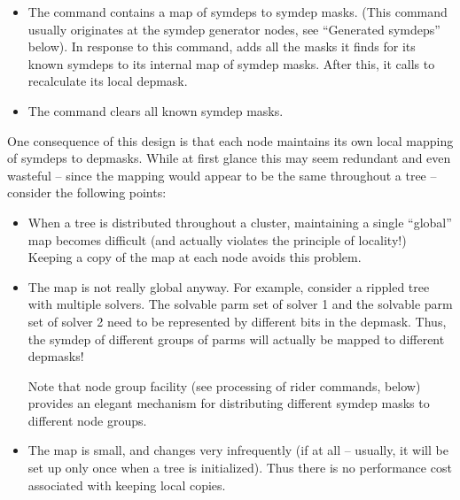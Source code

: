 \documentclass[10pt,twoside]{book}
\begin{document}
  \begin{itemize}
  
  \item The  command contains a map of symdeps to symdep
    masks. (This command usually originates at the symdep generator nodes, see
    ``Generated symdeps'' below). In response to this command,  adds
    all the masks it finds for its known symdeps to its internal map of symdep
    masks. After this, it calls  to recalculate its
    local depmask. 

  \item The  command clears all known symdep masks.
  
  \end{itemize}
  
  One consequence of this design is that each node maintains its own local
  mapping of symdeps to depmasks. While at first glance this may seem redundant
  and even wasteful -- since the mapping would appear to be the same throughout
  a tree -- consider the following points:

  \begin{itemize}
  
  \item When a tree is distributed throughout a cluster, maintaining a single
    ``global'' map becomes difficult (and actually violates the principle of
    locality!) Keeping a copy of the map at each node avoids this problem.

  \item The map is not really global anyway. For example, consider a rippled
    tree with multiple solvers. The solvable parm set of solver 1 and the
    solvable parm set of solver 2 need to be represented by different bits in
    the depmask. Thus, the  symdep of different groups of
    parms will actually be mapped to different depmasks!
    
    Note that node group facility (see processing of rider commands, below)
    provides an elegant mechanism for distributing different symdep masks to
    different node groups.
    
  \item The map is small, and changes very infrequently (if at all -- usually,
    it will be set up only once when a tree is initialized). Thus there is no
    performance cost associated with keeping local copies.

  \end{itemize}
  
\end{document}
